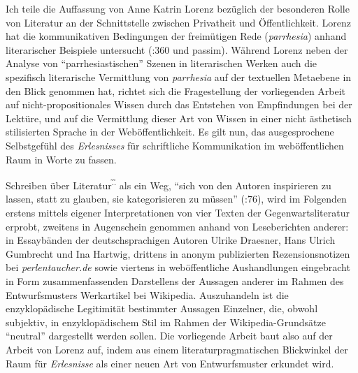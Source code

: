 \documentclass[fontsize=12pt]{scrartcl}
\begin{document}
Ich teile die Auffassung von Anne Katrin Lo\-renz be\-z\"ug\-lich der be\-son\-de\-ren Rol\-le von Li\-te\-ra\-tur an der Schnitt\-stel\-le zw\-ischen Pri\-vat\-heit und \"Of\-fent\-lich\-keit. Lorenz hat die kommunikativen Bedingungen der freim\"utigen Rede (\textit{parrhesia}) anhand li\-te\-ra\-rischer Beispiele untersucht (\cite{Lorenz2012}:360 und passim). W\"ahrend Lorenz neben der Ana\-lyse von "`parrhesiastischen"' Szenen in li\-te\-ra\-rischen Werken auch die spezifisch li\-te\-ra\-rische Ver\-mitt\-lung von \textit{parrhesia} auf der textuellen Metaebene in den Blick genommen hat, richtet sich die Fragestellung der vorliegenden Arbeit auf nicht-pro\-po\-si\-ti\-o\-na\-les Wissen durch das Entstehen von Emp\-fin\-dun\-gen bei der Lekt\"ure, und auf die Ver\-mitt\-lung dieser Art von Wissen in einer nicht \"asthetisch stilisierten Sprache in der Web\"of\-fent\-lichkeit. Es gilt nun, das ausgesprochene Selbstgef\"uhl des \textit{Erlesnisses} f\"ur schriftliche Kommunikation im web\"of\-fent\-lichen Raum in Worte zu fassen.

Schrei\-ben \"uber Li\-te\-ra\-tur\textsuperscript{\~.\~.} als ein Weg, "`sich von den Autoren inspirieren zu lassen, statt zu glauben, sie kategorisieren zu m\"ussen"' (\cite{Wertheimer2005}:76), wird im Folgenden erstens mittels eigener Interpretationen von \mbox{vier} Texten der Gegenwartsli\-te\-ra\-tur\- erprobt, zweitens in Augenschein genommen anhand von Leseberichten an\-de\-rer: in Essayb\"anden der deutschspra\-chi\-gen Autoren\textsuperscript{\tiny *} Ulrike Draesner, Hans Ulrich Gumbrecht und Ina Hartwig, drittens in anonym pu\-bli\-zierten Rezensionsnotizen bei \textit{per\-len\-tau\-cher.de} sowie viertens in web\"of\-fent\-liche Aushandlungen eingebracht in Form zusammenfassenden Dar\-stel\-lens der Aussagen an\-de\-rer im Rahmen des Entwurfsmusters Werkartikel bei Wi\-ki\-pe\-dia. Auszuhandeln ist die enzy\-klop\"adische Le\-gi\-ti\-mi\-t\"at bestimmter Aussagen Einzelner, die, obwohl subjektiv, in enzy\-klop\"adischem Stil im Rahmen der Wi\-ki\-pe\-dia-Grunds\"atze "`neutral"' dargestellt werden sollen. Die vorliegende Arbeit baut also auf der Arbeit von Lorenz auf, indem aus einem li\-te\-ra\-tur\-pragmatischen Blickwinkel der Raum f\"ur \textit{Erlesnisse} als einer neuen Art von Entwurfsmuster erkundet wird.
\end{document}
